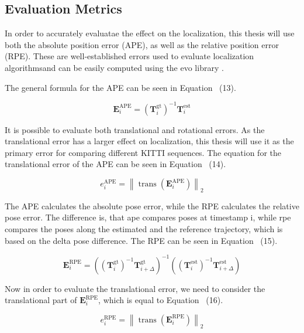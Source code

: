 \subsection{Evaluation Metrics}
In order to accurately evaluatae the effect on the localization, this thesis will use both the absolute position error (APE), as well as the relative position error (RPE). These are well-established errors used to evaluate localization algorithmsand can be easily computed using the evo library \cite{grupp_michaelgruppevo_2026}. 

The general formula for the APE can be seen in Equation ~(13).

\begin{equation}
\mathbf{E}_i^{\text{APE}} 
= 
\left( \mathbf{T}_i^{\text{gt}} \right)^{-1}
\mathbf{T}_i^{\text{est}}
\end{equation}

It is possible to evaluate both translational and rotational errors. As the translational error has a larger effect on localization, this thesis will use it as the primary error for comparing different KITTI sequences. The equation for the translational error of the APE can be seen in Equation ~(14).

\begin{equation}
e_i^{\text{APE}} 
= 
\left\| 
\operatorname{trans}\!\left( 
\mathbf{E}_i^{\text{APE}} 
\right)
\right\|_2
\end{equation}

The APE calculates the absolute pose error, while the RPE calculates the relative pose error. The difference is, that ape compares poses at timestamp i, while rpe compares the poses along the estimated and the reference trajectory, which is based on the delta pose difference. The RPE can be seen in Equation ~(15). 

\begin{equation}
\mathbf{E}_i^{\text{RPE}} 
=
\left(
\left( \mathbf{T}_i^{\text{gt}} \right)^{-1}
\mathbf{T}_{i+\Delta}^{\text{gt}}
\right)^{-1}
\left(
\left( \mathbf{T}_i^{\text{est}} \right)^{-1}
\mathbf{T}_{i+\Delta}^{\text{est}}
\right)
\end{equation}

Now in order to evaluate the translational error, we need to consider the translational part of $\mathbf{E}_i^{\text{RPE}} $, which is equal to Equation ~(16).

\begin{equation}
e_i^{\text{RPE}} 
=
\left\|
\operatorname{trans}\!\left(
\mathbf{E}_i^{\text{RPE}}
\right)
\right\|_2
\end{equation}

